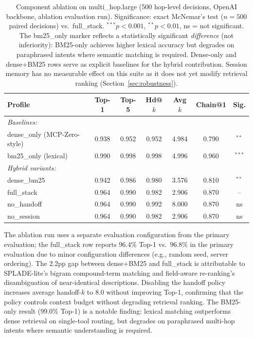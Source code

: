 \documentclass[sigconf,anonymous,review]{acmart}
\begin{document}
\begin{table}[t]
\centering
\scriptsize
\caption{Component ablation on multi\_hop.large (500 hop-level decisions, OpenAI
backbone, ablation evaluation run). Significance: exact McNemar's test ($n=500$
paired decisions) vs.\ full\_stack. $^{***}p<0.001$, $^{**}p<0.01$, ns = not
significant. The bm25\_only marker reflects a statistically significant
\emph{difference} (not inferiority): BM25-only achieves higher lexical accuracy
but degrades on paraphrased intents where semantic matching is required.
Dense-only and dense+BM25 rows serve as explicit baselines for the hybrid
contribution. Session memory has no measurable effect on this suite as it does not
yet modify retrieval ranking (Section~\ref{sec:robustness}).}
\label{tab:ablation}
\begin{tabular}{@{}lcccccc@{}}
\toprule
Profile & Top-1 & Top-5 & Hd@$k$ & Avg $k$ & Chain@1 & Sig. \\
\midrule
\textit{Baselines:} & & & & & & \\
dense\_only (MCP-Zero-style) & 0.938 & 0.952 & 0.952 & 4.984 & 0.790 & $^{**}$ \\
bm25\_only (lexical)         & 0.990 & 0.998 & 0.998 & 4.996 & 0.960 & $^{***}$ \\
\textit{Hybrid variants:} & & & & & & \\
dense\_bm25  & 0.942 & 0.986 & 0.980 & 3.576 & 0.810 & $^{**}$ \\
full\_stack  & 0.964 & 0.990 & 0.982 & 2.906 & 0.870 & -- \\
no\_handoff  & 0.964 & 0.990 & 0.992 & 8.000 & 0.870 & ns \\
no\_session  & 0.964 & 0.990 & 0.982 & 2.906 & 0.870 & ns \\
\bottomrule
\end{tabular}
\end{table}

The ablation run uses a separate evaluation configuration from the primary
evaluation; the full\_stack row reports 96.4\% Top-1 vs.\ 96.8\% in the primary
evaluation due to minor configuration differences (e.g., random seed, server
ordering).
The 2.2pp gap between dense+BM25 and full\_stack is attributable to SPLADE-lite's
bigram compound-term matching and field-aware re-ranking's disambiguation of
near-identical descriptions.
Disabling the handoff policy increases average handoff-$k$ to 8.0 without improving
Top-1, confirming that the policy controls context budget without degrading
retrieval ranking.
The BM25-only result (99.0\% Top-1) is a notable finding: lexical matching
outperforms dense retrieval on single-tool routing, but degrades on paraphrased
multi-hop intents where semantic understanding is required.
\end{document}
